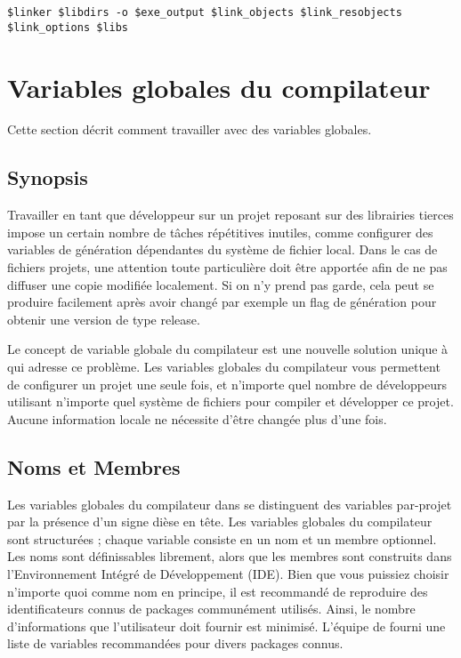 \begin{lstlisting}
$linker $libdirs -o $exe_output $link_objects $link_resobjects 
$link_options $libs
\end{lstlisting}

\section{Variables globales du compilateur}\label{sec:global_variables}

Cette section décrit comment travailler avec des variables globales.

\subsection{Synopsis}

Travailler en tant que développeur sur un projet reposant sur des librairies tierces impose un certain nombre de tâches répétitives inutiles, comme configurer des variables de génération dépendantes du système de fichier local. Dans le cas de fichiers projets, une attention toute particulière doit être apportée afin de ne pas diffuser une copie modifiée localement. Si on n'y prend pas garde, cela peut se produire facilement après avoir changé par exemple un flag de génération  pour obtenir une version de type release.

Le concept de variable globale du compilateur est une nouvelle solution unique à \codeblocks qui adresse ce problème. Les variables globales du compilateur vous permettent de configurer un projet une seule fois, et n'importe quel nombre de développeurs utilisant n'importe quel système de fichiers pour compiler et développer ce projet. Aucune information locale ne nécessite d'être changée plus d'une fois.

\subsection{Noms et Membres}

Les variables globales du compilateur dans \codeblocks se distinguent des variables par-projet par la présence d'un signe dièse en tête. Les variables globales du compilateur sont structurées ; chaque variable consiste en un nom et un membre optionnel. Les noms sont définissables librement, alors que les membres sont construits dans l'Environnement Intégré de Développement (IDE). Bien que vous puissiez choisir n'importe quoi comme nom en principe, il est recommandé de reproduire des identificateurs connus de packages communément utilisés. Ainsi, le nombre d'informations que l'utilisateur doit fournir est minimisé. L'équipe de \codeblocks fourni une liste de variables recommandées pour divers packages connus.

